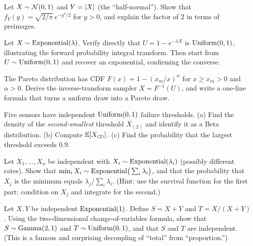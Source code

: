 \begin{exercise}
\label{ch16:ex-abs}
Let $X \sim \mathcal{N}(0,1)$ and $Y = \lvert X\rvert$ (the ``half-normal''). Show that
$f_Y(y) = \sqrt{2/\pi}\,e^{-y^2/2}$ for $y>0$, and explain the factor of $2$ in terms of
preimages.
\end{exercise}

\begin{exercise}
\label{ch16:ex-expo-pit}
Let $X \sim \operatorname{Exponential}(\lambda)$. Verify directly that $U = 1 - e^{-\lambda X}$ is $\operatorname{Uniform}(0,1)$,
illustrating the forward probability integral transform. Then start from
$U \sim \operatorname{Uniform}(0,1)$ and recover an exponential, confirming the converse.
\end{exercise}

\begin{exercise}
\label{ch16:ex-pareto}
The Pareto distribution has CDF $F(x) = 1 - (x_m/x)^{\alpha}$ for $x \ge x_m > 0$ and
$\alpha>0$. Derive the inverse-transform sampler $X = F^{-1}(U)$, and write a one-line
formula that turns a uniform draw into a Pareto draw.
\end{exercise}

\begin{exercise}
\label{ch16:ex-order}
Five sensors have independent $\operatorname{Uniform}(0,1)$ failure thresholds. (a) Find the density of the
\emph{second-smallest} threshold $X_{(2)}$ and identify it as a Beta distribution. (b)
Compute $\operatorname{\mathbb{E}}[X_{(2)}]$. (c) Find the probability that the largest threshold exceeds $0.9$.
\end{exercise}

\begin{exercise}
\label{ch16:ex-min-expo}
Let $X_1,\dots,X_n$ be independent with $X_i \sim \operatorname{Exponential}(\lambda_i)$ (possibly different
rates). Show that $\min_i X_i \sim \operatorname{Exponential}\!\big(\sum_i \lambda_i\big)$, and that the
probability that $X_j$ is the minimum equals $\lambda_j / \sum_i \lambda_i$. (Hint: use the
survival function for the first part; condition on $X_j$ and integrate for the second.)
\end{exercise}

\begin{exercise}
\label{ch16:ex-jacobian2}
Let $X, Y$ be independent $\operatorname{Exponential}(1)$. Define $S = X + Y$ and $T = X/(X+Y)$. Using the
two-dimensional change-of-variables formula, show that $S \sim \operatorname{Gamma}(2,1)$ and
$T \sim \operatorname{Uniform}(0,1)$, and that $S$ and $T$ are independent. (This is a famous and surprising
decoupling of ``total'' from ``proportion.'')
\end{exercise}

